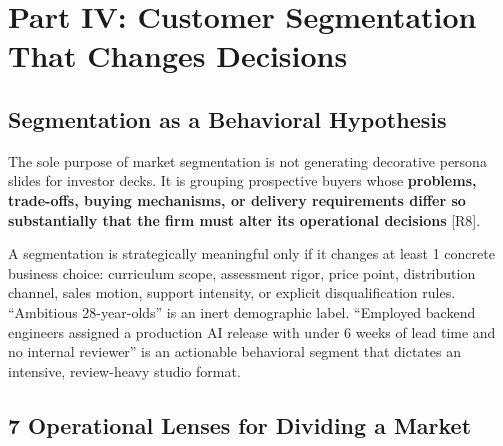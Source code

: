 \section{Part IV: Customer Segmentation That Changes Decisions}

\subsection{Segmentation as a Behavioral Hypothesis}

The sole purpose of market segmentation is not generating decorative persona slides for investor decks. It is grouping prospective buyers whose \textbf{problems, trade-offs, buying mechanisms, or delivery requirements differ so substantially that the firm must alter its operational decisions} [R8].

A segmentation is strategically meaningful only if it changes at least 1 concrete business choice: curriculum scope, assessment rigor, price point, distribution channel, sales motion, support intensity, or explicit disqualification rules. ``Ambitious 28-year-olds'' is an inert demographic label. ``Employed backend engineers assigned a production AI release with under 6 weeks of lead time and no internal reviewer'' is an actionable behavioral segment that dictates an intensive, review-heavy studio format.

\subsection{7 Operational Lenses for Dividing a Market}

